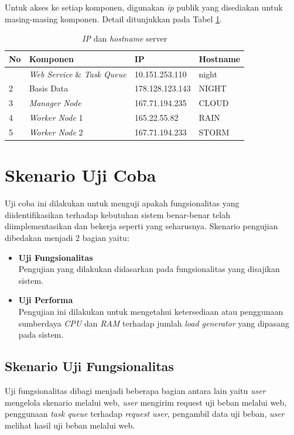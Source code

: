 		\indent Untuk akses ke setiap komponen, digunakan \textit{ip} publik yang disediakan untuk masing-masing komponen. Detail ditunjukkan pada Tabel \ref{ipserver}.
		\begin{longtable}{|p{}|p{}|p{}|p{}|}
			\caption{\textit{IP} dan \textit{hostname} server} \label{ipserver} \\
			\hline
			\textbf{No} & \textbf{Komponen} & \textbf{IP} & \textbf{Hostname} \\ \hline
			\endhead
			\endfoot
			\endlastfoot
			1 & \textit{Web Service} \& \textit{Task Queue} & 10.151.253.110 & night \\ \hline
			2 & Basis Data & 178.128.123.143 & NIGHT \\ \hline
			3 & \textit{Manager Node} & 167.71.194.235 & CLOUD \\ \hline
			4 & \textit{Worker Node} 1 & 165.22.55.82 & RAIN \\ \hline
			5 & \textit{Worker Node} 2 & 167.71.194.233 & STORM \\ \hline
		\end{longtable}
	
	\section{Skenario Uji Coba} \label{skenarioujicoba}
		Uji coba ini dilakukan untuk menguji apakah fungsionalitas yang diidentifikasikan terhadap kebutuhan sistem benar-benar telah diimplementasikan dan bekerja seperti yang seharusnya. Skenario pengujian dibedakan menjadi 2 bagian yaitu:
		\begin{itemize}
			\item \textbf{Uji Fungsionalitas} \\
				Pengujian yang dilakukan didasarkan pada fungsionalitas yang disajikan sistem.
			\item \textbf{Uji Performa} \\
				Pengujian ini dilakukan untuk mengetahui ketersediaan atau penggunaan sumberdaya \textit{CPU} dan \textit{RAM} terhadap jumlah \textit{load generator} yang dipasang pada sistem.
		\end{itemize} 
		
	\subsection{Skenario Uji Fungsionalitas}
		Uji fungsionalitas dibagi menjadi beberapa bagian antara lain yaitu \textit{user} mengelola skenario melalui web, \textit{user} mengirim request uji beban melalui web, penggunaan \textit{task queue} terhadap \textit{request user}, pengambil data uji beban, \textit{user} melihat hasil uji beban melalui web.
		
